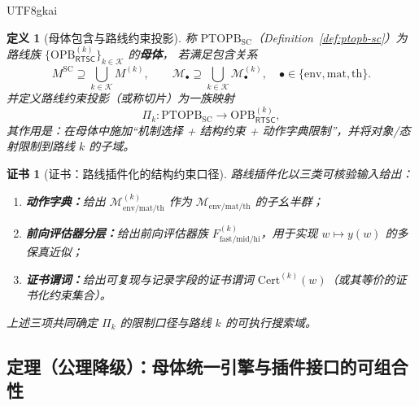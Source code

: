 \documentclass[12pt]{article}
\newtheorem{definition}{定义}[section]
\newtheorem{certificate}{证书}[section]
\newcommand{\PTOPB}{\ensuremath{\mathrm{PTOPB}}}
\newcommand{\OPB}{\ensuremath{\mathrm{OPB}}}
\newcommand{\RTSC}{\textsf{RTSC}}
\begin{document}
\begin{CJK*}{UTF8}{gkai}
\begin{definition}[母体包含与路线约束投影]
\label{def:mother-inclusion-projection}
称 \PTOPB$_{\mathrm{SC}}$（Definition~\ref{def:ptopb-sc}）为路线族 $\{\OPB^{(k)}_{\RTSC}\}_{k\in\mathcal{K}}$ 的\textbf{母体}，
  若满足包含关系
\[
M^{\mathrm{SC}} \supseteq \bigcup_{k\in\mathcal{K}} M^{(k)},
\qquad
\mathcal{M}_{\bullet} \supseteq \bigcup_{k\in\mathcal{K}} \mathcal{M}^{(k)}_{\bullet},
\quad \bullet\in\{\mathrm{env},\mathrm{mat},\mathrm{th}\}.
\]
并定义路线约束投影（或称切片）为一族映射
\[
\Pi_k:\PTOPB_{\mathrm{SC}}\to \OPB^{(k)}_{\RTSC},
\]
其作用是：在母体中施加“机制选择 + 结构约束 + 动作字典限制”，并将对象/态射限制到路线 $k$ 的子域。
\end{definition}

\begin{certificate}[证书：路线插件化的结构约束口径]
\label{cert:plugin-structure}
路线插件化以三类可核验输入给出：
\begin{enumerate}
  \item \textbf{动作字典：}给出 $\mathcal{M}^{(k)}_{\mathrm{env/mat/th}}$ 作为 $\mathcal{M}_{\mathrm{env/mat/th}}$ 的子幺半群；
  \item \textbf{前向评估器分层：}给出前向评估器族 $F^{(k)}_{\mathrm{fast/mid/hi}}$，用于实现 $w\mapsto y(w)$ 的多保真近似；
  \item \textbf{证书谓词：}给出可复现与记录字段的证书谓词 $\mathrm{Cert}^{(k)}(w)$（或其等价的证书化约束集合）。
\end{enumerate}
上述三项共同确定 $\Pi_k$ 的限制口径与路线 $k$ 的可执行搜索域。
\end{certificate}

\subsection{定理（公理降级）：母体统一引擎与插件接口的可组合性}


\end{CJK*}
\end{document}
